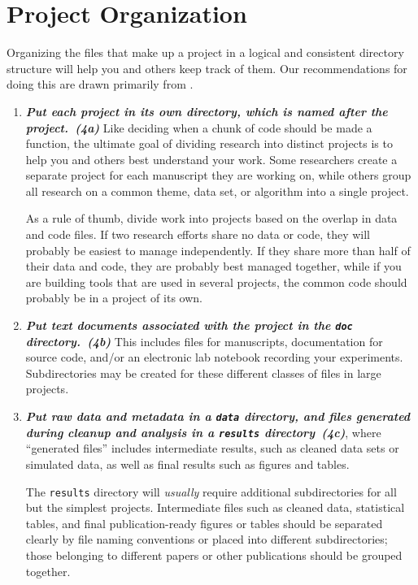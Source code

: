 \documentclass[10pt,letterpaper]{article}
\newcommand{\practicesection}[2]{\section{#1}\label{#2}}
\newcommand{\practice}[2]{\textbf{\emph{{#2}~({#1})}}}
\begin{document}
\practicesection{Project Organization}{sec:project}

Organizing the files that make up a project in a logical and
consistent directory structure will help you and others keep track of
them.  Our recommendations for doing this are drawn primarily from
\cite{noble2009,gentzkow2014}.

\begin{enumerate}

\item
  \practice{4a}{Put each project in its own directory, which is named
    after the project.}  Like deciding when a chunk of code should be
  made a function, the ultimate goal of dividing research into
  distinct projects is to help you and others best understand your
  work. Some researchers create a separate project for each manuscript
  they are working on, while others group all research on a common
  theme, data set, or algorithm into a single project.

  As a rule of thumb, divide work into projects based on the overlap
  in data and code files. If two research efforts share no data or
  code, they will probably be easiest to manage independently. If they
  share more than half of their data and code, they are probably best
  managed together, while if you are building tools that are used in
  several projects, the common code should probably be in a project of
  its own.

\item
  \practice{4b}{Put text documents associated with the project in the
    \texttt{doc} directory.} This includes files for manuscripts,
  documentation for source code, and/or an electronic lab notebook
  recording your experiments.  Subdirectories may be created for these
  different classes of files in large projects.

\item
  \practice{4c}{Put raw data and metadata in a \texttt{data} directory,
    and files generated during cleanup and analysis in a
    \texttt{results} directory}, where ``generated files'' includes
  intermediate results, such as cleaned data sets or simulated data,
  as well as final results such as figures and tables.

  The \texttt{results} directory will \emph{usually}
  require additional subdirectories for all but the simplest
  projects. Intermediate files such as cleaned data, statistical
  tables, and final publication-ready figures or tables should be
  separated clearly by file naming conventions or placed into
  different subdirectories; those belonging to different papers or
  other publications should be grouped together.


\end{enumerate}
\end{document}
